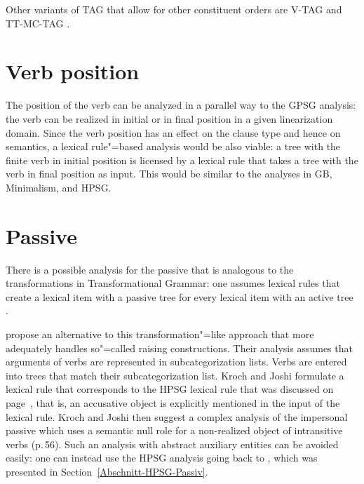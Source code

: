 Other variants of TAG that allow for other constituent orders are V-TAG \citep{Rambow94a} 
and TT-MC-TAG \citep{Lichte2007a}.

\section{Verb position}

The position of the verb can be analyzed in a parallel way to the GPSG analysis:
the verb can be realized in initial or in final position in a given linearization domain. Since the
verb position has an effect on the clause type and hence on semantics, a lexical rule"=based
analysis would be also viable: a tree with the finite verb in initial position is licensed by a
lexical rule that takes a tree with the verb in final position as input. This would be similar to
the analyses in GB, Minimalism, and HPSG.

\section{Passive}

There is a possible analysis for the passive that is analogous to the transformations in Transformational Grammar: one assumes lexical rules that
create a lexical item with a passive tree for every lexical item with an active tree \citep[--51]{KJ85a}. 

\citet[]{KJ85a} propose an alternative to this transformation"=like approach that more adequately handles so"=called raising constructions.
Their analysis assumes that arguments of verbs are represented in subcategorization lists. Verbs are entered into trees that match their subcategorization
list. Kroch and Joshi formulate a lexical rule that corresponds to the HPSG lexical rule that was discussed on page~\pageref{pass-lr-mlr}, that is,
an accusative object is explicitly mentioned in the input of the lexical rule. Kroch and Joshi then suggest a complex analysis of the impersonal passive which
uses a semantic null role for a non-realized object of intransitive verbs (p.\,56). Such an analysis
with abstract auxiliary entities can be avoided easily: one can instead use the HPSG\indexhpsg
analysis going back to \citet{Haider86}, which was presented in Section~\ref{Abschnitt-HPSG-Passiv}.

